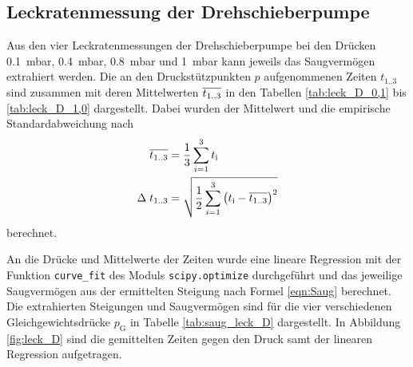 


\subsection{Leckratenmessung der Drehschieberpumpe}
\label{sec:AuswLeckD}

Aus den vier Leckratenmessungen der Drehschieberpumpe
bei den Drücken \SI{0.1}{\milli\bar},
\SI{0.4}{\milli\bar}, \SI{0.8}{\milli\bar} und \SI{1}{\milli\bar}
kann jeweils das Saugvermögen extrahiert werden.
Die an den Druckstützpunkten $p$ aufgenommenen
Zeiten $t_\text{1..3}$ sind zusammen mit deren Mittelwerten $\overline{t_\text{1..3}}$
in den Tabellen \ref{tab:leck_D_0,1} bis \ref{tab:leck_D_1,0} dargestellt.
Dabei wurden der Mittelwert und die empirische Standardabweichung nach
\begin{align*}
  \overline{t_\text{1..3}} &= \frac{1}{3} \sum_{i = 1}^3 t_\text{i} \\
  \Delta \; t_\text{1..3} &=
  \sqrt{\frac{1}{2} \sum_{i = 1}^3 \left(t_\text{i} - \overline{t_\text{1..3}}\right)^2}
\end{align*}
berechnet.





\FloatBarrier

An die Drücke und Mittelwerte der Zeiten wurde eine
lineare Regression mit der Funktion \texttt{curve\_fit}
des Moduls \texttt{scipy.optimize} durchgeführt
und das jeweilige Saugvermögen aus der ermittelten Steigung nach Formel \eqref{eqn:Saug}
berechnet. Die extrahierten Steigungen und Saugvermögen sind für
die vier verschiedenen Gleichgewichtsdrücke $p_\text{G}$
in Tabelle \ref{tab:saug_leck_D} dargestellt.
In Abbildung \ref{fig:leck_D} sind die gemittelten Zeiten gegen den Druck
samt der linearen Regression aufgetragen.

